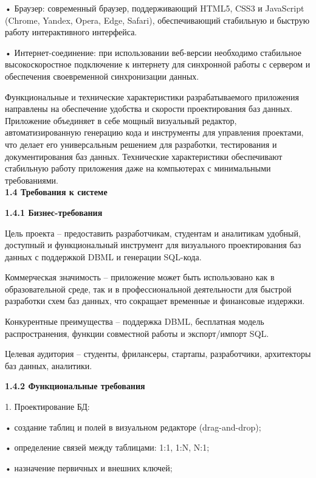  • Браузер: современный браузер, поддерживающий HTML5, CSS3 и JavaScript (Chrome, Yandex, Opera, Edge, Safari), обеспечивающий стабильную и быструю работу интерактивного интерфейса.
 
 • Интернет-соединение: при использовании веб-версии необходимо стабильное высокоскоростное подключение к интернету для синхронной работы с сервером и обеспечения своевременной синхронизации данных.

Функциональные и технические характеристики разрабатываемого приложения направлены на обеспечение удобства и скорости проектирования баз данных. Приложение объединяет в себе мощный визуальный редактор, автоматизированную генерацию кода и инструменты для управления проектами, что делает его универсальным решением для разработки, тестирования и документирования баз данных. Технические характеристики обеспечивают стабильную работу приложения даже на компьютерах с минимальными требованиями.
\\

\textbf{\large 1.4 Требования к системе}

\textbf{\large 1.4.1 Бизнес-требования}

	Цель проекта – предоставить разработчикам, студентам и аналитикам удобный, доступный и функциональный инструмент для визуального проектирования баз данных с поддержкой DBML и генерации SQL-кода.
    
	Коммерческая значимость – приложение может быть использовано как в образовательной среде, так и в профессиональной деятельности для быстрой разработки схем баз данных, что сокращает временные и финансовые издержки.
    
	Конкурентные преимущества – поддержка DBML, бесплатная модель распространения, функции совместной работы и экспорт/импорт SQL.
    
	Целевая аудитория – студенты, фрилансеры, стартапы, разработчики, архитекторы баз данных, аналитики.

\textbf{\large 1.4.2 Функциональные требования }

	1.	Проектирование БД:
    
	•	создание таблиц и полей в визуальном редакторе (drag-and-drop);
    
	•	определение связей между таблицами: 1:1, 1:N, N:1;
    
	•	назначение первичных и внешних ключей;
    
